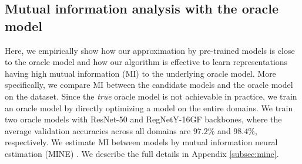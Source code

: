 \begin{algorithm}[t!]
    \DontPrintSemicolon
    \caption{\fullname{} (\method{})}
    \label{algorithm}

    
\end{algorithm}


\subsection{Mutual information analysis with the oracle model}
\label{subsection:mi_with_oracle}

Here, we empirically show how our approximation by pre-trained models is close to the oracle model and how our algorithm is effective to learn representations having high mutual information (MI) to the underlying oracle model. More specifically, we compare MI between the candidate models and the oracle model on the \pacs{} dataset.
Since the \emph{true} oracle model 
is not achievable in practice, we train an oracle model by directly optimizing a model on the entire domains. We train two oracle models with ResNet-50 and RegNetY-16GF backbones, where the average validation accuracies across all domains
are $97.2\%$ and $98.4\%$, respectively. We estimate MI between models by mutual information neural estimation (MINE) \cite{belghazi2018mine}. We describe the full details in Appendix \ref{subsec:mine}.

